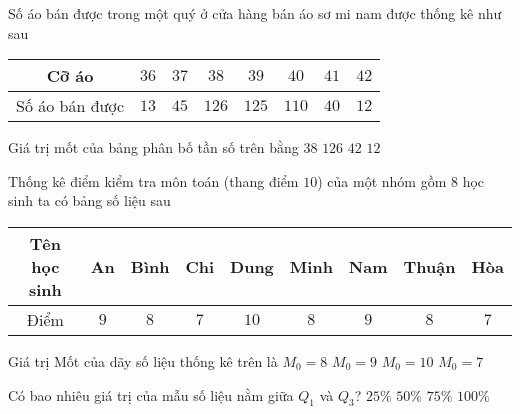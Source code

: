 \begin{ex}%
	Số áo bán được trong một quý ở cửa hàng bán áo sơ mi nam được thống kê như sau
	\begin{center}
		\begin{tabular}{|c|c|c|c|c|c|c|c|}
			\hline
			Cỡ áo &$36$ &$37$ &$38$ &$39$ &$40$ &$41$ &$42$\\
			\hline
			Số áo bán được &$13$ &$45$ &$126$ &$125$ &$110$ &$40$ &$12$\\
			\hline
		\end{tabular}
	\end{center}
	Giá trị mốt của bảng phân bố tần số trên bằng
	\choice
	{\True $38$}
	{$126$}
	{$42$}
	{$12$}
\end{ex}

\begin{ex}%
Thống kê điểm kiểm tra môn toán (thang điểm $10$) của một nhóm gồm $8$ học sinh ta có bảng số liệu sau
\begin{center}
\begin{tabular}{|c|c|c|c|c|c|c|c|c|}
\hline
Tên học sinh&An&Bình&Chi&Dung&Minh&Nam&Thuận&Hòa\\
\hline
Điểm&$9$&$8$&$7$&$10$&$8$&$9$&$8$&$7$\\
\hline
\end{tabular}
\end{center}
Giá trị Mốt của dãy số liệu thống kê trên là
\choice
{\True $M_0=8$}
{$M_0=9$}
{$M_0=10$}
{$M_0=7$}
\end{ex}

\begin{ex}%
Có bao nhiêu giá trị của mẫu số liệu nằm giữa $Q_1$ và $Q_3$?
\choice
{$25\%$}
{\True $50\%$}
{$75\%$}
{$100\%$}
\end{ex}

